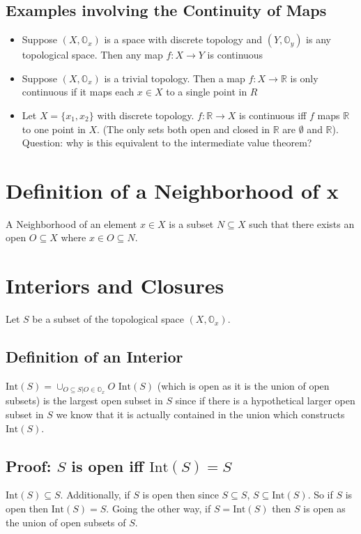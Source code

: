 \documentclass{homework}
\newcommand{\inte}{\text{Int}}
\newcommand{\OO}{\mathbb{O}}
\begin{document}
\subsection{Examples involving the Continuity of Maps}
\begin{itemize}
\item{Suppose $(X,\OO_x)$ is a space with discrete topology and $(Y,\OO_y)$ is any topological space. Then any map $f: X \rightarrow Y$ is continuous}
\item{Suppose $(X,\OO_x)$ is a trivial topology. Then a map $f: X \rightarrow \mathbb{R}$ is only continuous if it maps each $x \in X$ to a single point in $R$}
\item{Let $X = \{x_1,x_2\}$ with discrete topology. $f: \mathbb{R} \rightarrow X$ is continuous iff $f$ maps $\mathbb{R}$ to one point in $X$. (The only sets both open and closed in $\mathbb{R}$ are $\emptyset$ and $\mathbb{R}$). Question: why is this equivalent to the intermediate value theorem?}
\end{itemize}

\section{Definition of a Neighborhood of x}
A Neighborhood of an element $x \in X$ is a subset $N \subseteq X$ such that there exists an open $O \subseteq X$ where $x \in O \subseteq N$. 

\section{Interiors and Closures}
Let $S$ be a subset of the topological space $(X,\OO_x)$. 
\subsection{Definition of an Interior}
$\inte(S) = \cup_{O \subseteq S | O \in \OO_x}O$
$\inte(S)$ (which is open as it is the union of open subsets) is the largest open subset in $S$ since if there is a hypothetical larger open subset in $S$ we know that it is actually contained in the union which constructs $\inte(S)$.

\subsection{Proof: $S$ is open iff $\inte(S) = S$}
$\inte(S) \subseteq S$. Additionally, if $S$ is open then since $S \subseteq S$, $S  \subseteq \inte(S)$. So if $S$ is open then $\inte(S) =S$. Going the other way, if $S = \inte(S) $ then $S$ is open as the union of open subsets of $S$.
\end{document}

